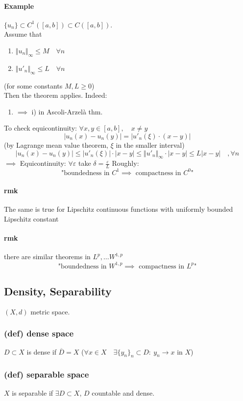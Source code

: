 \paragraph{Example} $\{u_n\}\subset C^1([a,b])\subset C([a,b])$.\\
Assume that
\begin{enumerate}
    \item $\Vert u_n\Vert_\infty \leq M\quad \forall n$
    \item $\Vert u'_n\Vert_\infty\leq L\quad \forall n$
\end{enumerate}
(for some constants $M,L\geq 0$)\\
Then the theorem applies. Indeed:
\begin{enumerate}
    \item $\implies$ i) in Ascoli-Arzelà thm.
\end{enumerate}
To check equicontinuity: $\forall x,y\in[a,b], \quad x\neq y$
$$|u_n(x)-u_n(y)|=|u'_n(\xi)\cdot (x-y)|$$
(by Lagrange mean value theorem, $\xi$ in the smaller interval)
$$|u_n(x)-u_n(y)|\leq|u'_n(\xi)|\cdot|x-y|\leq \Vert u'_n\Vert_\infty\cdot|x-y|\leq L|x-y|\quad ,\forall n$$
$\implies$ Equicontinuity: $\forall \varepsilon $ take $\delta =\frac \varepsilon L$
Roughly:
$$\text{"boundedness in }C^1\implies \text{ compactness in }C^0\text{"} $$
\paragraph{rmk}
The same is true for Lipschitz continuous functions with uniformly bounded Lipschitz constant
\paragraph{rmk}
there are similar theorems in $L^p, \dots W^{1,p}$
$$\text{"boundedness in }W^{1,p}\implies \text{ compactness in }L^p\text{"} $$
\subsection{Density, Separability}
$(X,d)$ metric space.
\subsubsection{(def) dense space}
$D\subset X$ is dense if $\overline{D}=X$ ($\forall x\in X\quad \exists \{y_n\}_n\subset D : \ y_n\to x\text{ in }X$)
\subsubsection{(def) separable space}
$X$ is separable if $\exists D\subset X$, $D$ countable and dense.
